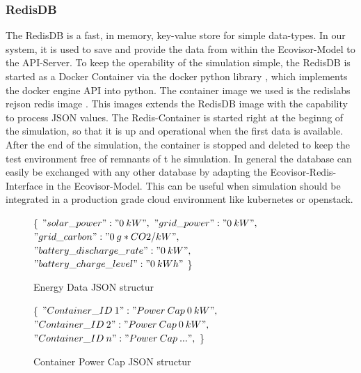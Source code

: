 \subsubsection{RedisDB}
The RedisDB is a fast, in memory, key-value store for simple data-types. In our system, it is used to save and provide the data from within the Ecovisor-Model to the API-Server. To keep the operability of the simulation simple, the RedisDB is started as a Docker Container via the docker python library \cite{docker_python}, which implements the docker engine API into python. The container image we used is the redislabs rejson redis image \cite{RedisJSON}. This images extends the RedisDB image with the capability to process JSON values. The Redis-Container is started right at the beginng of the simulation, so that it is up and operational when the first data is available. After the end of the simulation, the container is stopped and deleted to keep the test environment free of remnants of t he simulation.
In general the database can easily be exchanged with any other database by adapting the Ecovisor-Redis-Interface in the Ecovisor-Model. This can be useful when simulation should be integrated
in a production grade cloud environment like kubernetes or openstack.






\begin{figure}
	\removelatexerror
	\begin{algorithm}[H]
		\caption{Energy Data JSON structur}
		\label{alg:energy_JSON}
		\{\;
			$"solar\_power" : "0\: kW",$\;
			$"grid\_power" : "0\: kW",$\;
			$"grid\_carbon" : "0\: g*CO2/kW",$\;
			$"battery\_discharge\_rate" : "0\: kW",$\;
			$"battery\_charge\_level" : "0\: kWh"$\;
		\}
		\vspace{3mm}
	\end{algorithm}
\end{figure}

\begin{figure}
	\removelatexerror
	\begin{algorithm}[H]
		\caption{Container Power Cap JSON structur}
		\label{alg:container_JSON}
		\{\;
		$"Container\_ID\: 1" : "Power\: Cap\: 0\: kW",$\;
		$"Container\_ID\: 2" : "Power\: Cap\: 0\: kW",$\;
		$"Container\_ID\: n" : "Power\: Cap\: ...",$\;
		\}
		\vspace{3mm}
	\end{algorithm}
\end{figure}

